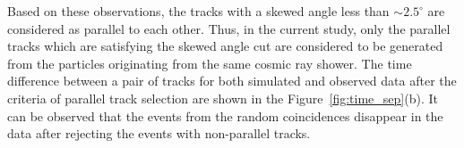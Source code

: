 Based on these observations, the tracks with a skewed angle less than
$\sim 2.5^{\circ}$ are considered as parallel to each other.
Thus, in the current study, only the parallel tracks which are
satisfying the skewed angle cut are considered to be generated
from the particles originating from the same cosmic ray shower.
The time difference between a pair of tracks for both simulated
and observed data after the criteria of parallel track selection
are shown in the Figure~\ref{fig:time_sep}(b). It can be observed
that the events from the random coincidences disappear in the data
after rejecting the events with non-parallel tracks.
